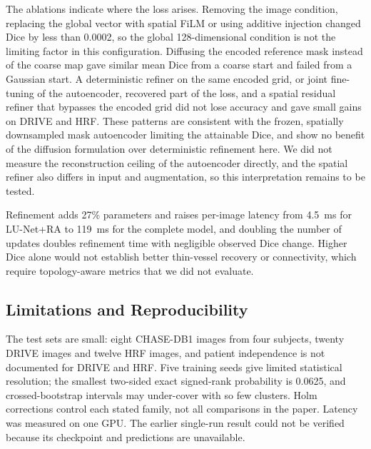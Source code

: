 \documentclass[jimaging,article,submit,pdftex,moreauthors]
  {Definitions/mdpi}
\newcommand{\revbegin}{\begingroup\color{blue}}
\newcommand{\revbegin}{\begingroup}
\newcommand{\revend}{\ifhmode\par\fi\endgroup}
\providecommand{\linelabel}[1]{}
\newcommand{\seclabel}[1]{\linelabel{rev:sec:#1}}
\newcommand{\secend}[1]{\linelabel{rev:end:#1}}
\begin{document}
The ablations indicate where the loss arises. Removing the image condition, replacing the global vector with spatial FiLM or using additive injection changed Dice by less than 0.0002, so the global 128-dimensional condition is not the limiting factor in this configuration. Diffusing the encoded reference mask instead of the coarse map gave similar mean Dice from a coarse start and failed from a Gaussian start. A deterministic refiner on the same encoded grid, or joint fine-tuning of the autoencoder, recovered part of the loss, and a spatial residual refiner that bypasses the encoded grid did not lose accuracy and gave small gains on DRIVE and HRF. These patterns are consistent with the frozen, spatially downsampled mask autoencoder limiting the attainable Dice, and show no benefit of the diffusion formulation over deterministic refinement here. We did not measure the reconstruction ceiling of the autoencoder directly, and the spatial refiner also differs in input and augmentation, so this interpretation remains to be tested.

Refinement adds 27\% parameters and raises per-image latency from 4.5~ms for LU-Net+RA to 119~ms for the complete model, and doubling the number of updates doubles refinement time with negligible observed Dice change. Higher Dice alone would not establish better thin-vessel recovery or connectivity, which require topology-aware metrics that we did not evaluate.\secend{discussion}\revend{}

\subsection{Limitations and Reproducibility}
\label{sec:limitations}
\seclabel{limitations}

\revbegin{}The test sets are small: eight CHASE-DB1 images from four subjects, twenty DRIVE images and twelve HRF images, and patient independence is not documented for DRIVE and HRF. Five training seeds give limited statistical resolution; the smallest two-sided exact signed-rank probability is 0.0625, and crossed-bootstrap intervals may under-cover with so few clusters. Holm corrections control each stated family, not all comparisons in the paper. Latency was measured on one GPU. The earlier single-run result could not be verified because its checkpoint and predictions are unavailable.\revend{}
\end{document}
